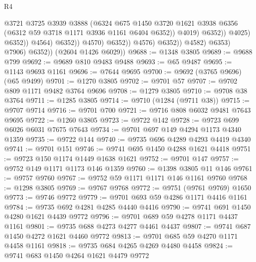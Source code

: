 \begin{lexlean}{R4}
\begin{coremodule}
                                              @3721
                                              @3725
                                              @3939
                                              @3888
                                              (@6324
                                                @675
                                                @1450
                                                @3720
                                                @1621
                                                @3938
                                                @6356
                                                (@6312 @59 @3718 @1171 @3936 @1161 @6404 @6352))
                                              @4019)
                                            @6352))
                                        @4025)
                                      @6352))
                                  @4564)
                                @6352))
                            @4570)
                          @6352))
                      @4576)
                    @6352))
                @4582)
              @6353)
            @7906)
          @6352))
      (@2604 @1426 @6029))
@9688 := @1348 @3805
@9689 := @9688 @799
@9692 := @9689 @810 @9483 @9488
@9693 := @65 @9487
@9695 := @1143 @9693 @1161
@9696 := @7644 @9695
@9700 := @9692 (@3765 @9696) (@65 @9499)
@9701 := @1270 @3805
@9702 := @9701 @57
@9707 := @9702 @809 @1171 @9482 @3764 @9696
@9708 := @1279 @3805
@9710 := @9708 @38 @3764
@9711 := @1285 @3805
@9714 := @9710 (@1284 (@9711 @38))
@9715 := @9707 @9714
@9716 := @9701 @700
@9721 := @9716 @808 @6032 @9481 @7643 @9695
@9722 := @1260 @3805
@9723 := @9722 @142
@9728 := @9723 @699 @6026 @6031 @7675 @7643
@9734 := @9701 @697 @149 @4294 @1173 @4340 @1359
@9735 := @9722 @144
@9740 := @9735 @696 @4289 @4293 @4419 @4340
@9741 := @9701 @151
@9746 := @9741 @695 @1450 @4288 @1621 @4418
@9751 := @9723 @150 @1174 @1449 @1638 @1621
@9752 := @9701 @147
@9757 := @9752 @149 @1171 @1173 @146 @1359
@9760 := @1398 @3805 @11 @146
@9761 := @9757 @9760
@9767 := @9752 @59 @1171 @1171 @146 @1161 @9760
@9768 := @1298 @3805
@9769 := @9767 @9768
@9772 := @9751 (@9761 @9769) @1650
@9773 := @9746 @9772
@9779 := @9701 @693 @59 @4286 @1171 @4416 @1161
@9784 := @9735 @692 @4281 @4285 @4440 @4416
@9790 := @9741 @691 @1450 @4280 @1621 @4439 @9772
@9796 := @9701 @689 @59 @4278 @1171 @4437 @1161
@9801 := @9735 @688 @4273 @4277 @4461 @4437
@9807 := @9741 @687 @1450 @4272 @1621 @4460 @9772
@9813 := @9701 @685 @59 @4270 @1171 @4458 @1161
@9818 := @9735 @684 @4265 @4269 @4480 @4458
@9824 := @9741 @683 @1450 @4264 @1621 @4479 @9772

\end{coremodule}
\end{lexlean}
